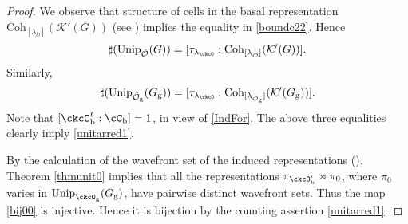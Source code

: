 \documentclass[12pt,a4paper]{amsart}
\newcommand{\CK}{{\mathcal {K}}}
\newcommand{\CO}{{\mathcal {O}}}
\numberwithin{equation}{section}
\theoremstyle{remark}
\def\Unip{\mathrm{Unip}}
\def\lamck{\lambda_\ckcO}
\def\Coh{\mathrm{Coh}}
\def\ckcOpb{\ckcO'_{\mathrm b}}
\def\Gg{G_{\mathrm g}}
\begin{document}
\begin{proof}
  We observe that structure of cells in the basal representation
  $\Coh_{[\lambda_{\check \CO}]}(\CK'(G))$ (see \cite[Theorem 5]{Bo}) implies
  the equality in \eqref{boundc22}. Hence
  \[
    \sharp(\Unip_{\check \CO}(G)) =[\tau_{\lamck}: \Coh_{[\lambda_{\check \CO}]}(\CK'(G))].
  \]
  Similarly,
  \[
    \sharp(\Unip_{\check \CO_\mathrm g}(G_\mathrm g)) = [\tau_{\lamck}: \Coh_{[\lambda_{\check \CO_\mathrm g}]}(\CK'(G_\mathrm g))].
  \]
  Note that $[\ckcO_{\mathrm b}^{t}:\cC_{\mathrm b}]=1$, in view of
  \eqref{IndFor}. The above three equalities clearly imply \eqref{unitarred1}.
 
 By the  calculation of  the wavefront set of the induced representations (\cite[Corollary 5.0.10]{B.Orbit}),  Theorem \ref{thmunit0} implies that all the representations $\pi_{\ckcOpb}\rtimes \pi_{0}$, where $\pi_0$ varies in $\Unip_{\ckcO_{\mathrm g}}(\Gg)$, have pairwise distinct wavefront sets.   Thus the map \eqref{bij00} is injective. Hence it is bijection by the counting assertion \eqref{unitarred1}.
\end{proof}

\end{document}
